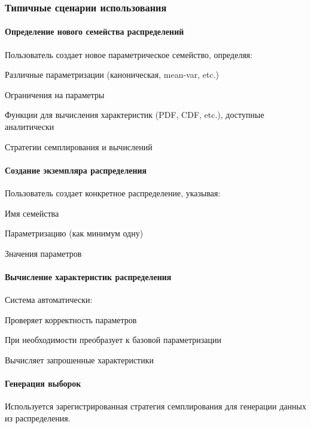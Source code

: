 \subsubsection{Типичные сценарии использования}

\paragraph{Определение нового семейства распределений}
Пользователь создает новое параметрическое семейство, определяя:
\begin{itemizecmp}
    \item Различные параметризации (каноническая, mean-var, etc.)
    \item Ограничения на параметры
    \item Функции для вычисления характеристик (PDF, CDF, etc.), доступные аналитически 
    \item Стратегии семплирования и вычислений
\end{itemizecmp}

\paragraph{Создание экземпляра распределения}
Пользователь создает конкретное распределение, указывая:
\begin{itemizecmp}
    \item Имя семейства
    \item Параметризацию (как минимум одну)
    \item Значения параметров
\end{itemizecmp}

\paragraph{Вычисление характеристик распределения}
Система автоматически:
\begin{itemizecmp}
    \item Проверяет корректность параметров
    \item При необходимости преобразует к базовой параметризации
    \item Вычисляет запрошенные характеристики
\end{itemizecmp}

\paragraph{Генерация выборок}
Используется зарегистрированная стратегия семплирования для генерации данных из распределения.


